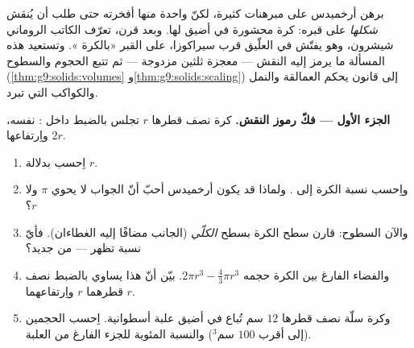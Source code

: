 \begin{problem}
\label{pb:g9:solids:1}
برهن أرخميدس على مبرهنات كثيرة، لكنّ واحدة منها أفخرته حتى طلب
أن يُنقش \emph{شكلها} على قبره: كرة محشورة في أضيق 
لها. وبعد قرن، تعرّف الكاتب الروماني شيشرون، وهو يفتّش في
العلّيق قرب سيراكوزا، على القبر «بالكرة ». وتستعيد
هذه المسألة ما يرمز إليه النقش --- معجزة ثلثين مزدوجة --- ثم
تتبع الحجوم والسطوح (\cref{thm:g9:solids:volumes}
و\cref{thm:g9:solids:scaling}) إلى قانون يحكم العمالقة والنمل
والكواكب التي تبرد.

\medskip
\noindent\textbf{الجزء الأول --- فكّ رموز النقش.}
كرة نصف قطرها $r$ تجلس بالضبط داخل : 
نفسه، واِرتفاعها $2r$.
\begin{enumerate}
  \item اِحسب   بدلالة $r$.
  \item واِحسب نسبة  الكرة إلى  . ولماذا قد
        يكون أرخميدس أحبّ أنّ الجواب لا يحوي $\pi$ ولا $r$؟
  \item والآن السطوح: قارن  سطح الكرة بسطح 
        \emph{الكلّي} (الجانب مضافًا إليه الغطاءان). فأيّ نسبة
        تظهر --- من جديد؟
  \item والفضاء الفارغ بين الكرة  حجمه
        $2\pi r^3 - \frac43\pi r^3$. بيّن أنّ هذا  يساوي
        بالضبط  \emph{} نصف قطرهما
        $r$ واِرتفاعهما $r$.
  \item وكرة سلّة نصف قطرها $12$ سم تُباع في أضيق علبة
        أسطوانية. اِحسب الحجمين (إلى أقرب
        $100$ سم$^3$) والنسبة المئوية للجزء الفارغ من
        العلبة.
\end{enumerate}


\end{problem}
